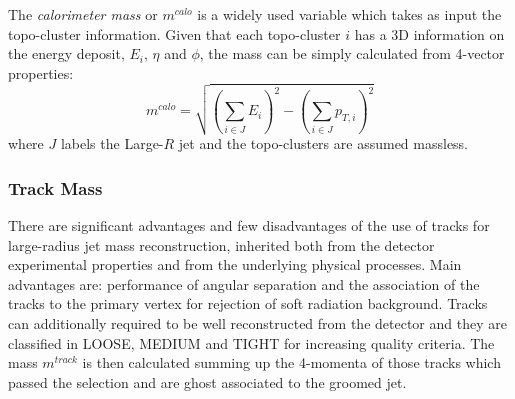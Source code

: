 The \textit{calorimeter mass} or $m^{calo}$ is a widely used variable which takes as input the topo-cluster information. Given that each topo-cluster $i$ has a 3D information on the energy deposit, $E_i$, $\eta$ and $\phi$, the mass can be simply calculated from 4-vector properties:
$$m^{calo}=\sqrt{\left(\sum_{i\in J}E_i\right)^2-\left(\sum_{i\in J}p_{T,i}\right)^2} $$
where $J$ labels the Large-$R$ jet and the topo-clusters are assumed massless.

\subsubsection{Track Mass}
\label{sec:tracks}
There are significant advantages and few disadvantages of the use of tracks for large-radius jet mass reconstruction, inherited both from the detector experimental properties and from the underlying physical processes. 
Main advantages are: performance of angular separation and the association of the tracks to the primary vertex for rejection of soft radiation background.
Tracks can additionally required to be well reconstructed from the detector and they are classified in  \textrm{LOOSE},  \textrm{MEDIUM} and \textrm{TIGHT} for increasing quality criteria.
The mass $m^{track}$ is then calculated summing up the 4-momenta of those tracks which passed the selection and are ghost associated to the groomed jet.





